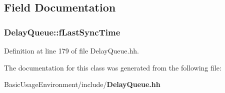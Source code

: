 \subsection{Field Documentation}
\subsubsection[{f\+Last\+Sync\+Time}]{ Delay\+Queue\+::f\+Last\+Sync\+Time\hspace{0.3cm}{\ttfamily [private]}}\label{classDelayQueue_a88df1224211a700b6461e29a18fe3199}


Definition at line 179 of file Delay\+Queue.\+hh.



The documentation for this class was generated from the following file\+:\begin{DoxyCompactItemize}
\item 
Basic\+Usage\+Environment/include/{\bf Delay\+Queue.\+hh}\end{DoxyCompactItemize}
